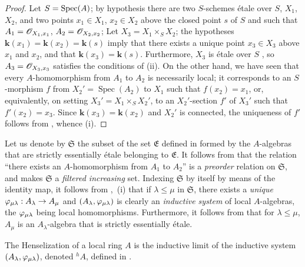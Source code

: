 \begin{proof}
Let $S=\operatorname{Spec}(A)$;
by hypothesis there are two $S$-schemes \'{e}tale over $S$, $X_1$, $X_2$, and two points $x_1\in X_1$, $x_2\in X_2$ above the closed point $s$ of $S$ and such that $A_1=\mathscr{O}_{X_1,x_1}$, $A_2=\mathscr{O}_{X_2,x_2}$;
Let $X_3=X_1\times_{S}X_2$;
the hypotheses $\boldsymbol{k}(x_1)=\boldsymbol{k}(x_2)=\boldsymbol{k}(s)$  imply that there exists a unique point $x_3\in X_3$ above $x_1$ and $x_2$, and that $\boldsymbol{k}(x_3)=\boldsymbol{k}(s)$.
Furthermore, $X_3$ is \'{e}tale over $S$ , so $A_3=\mathscr{O}_{X_3,x_3}$ satisfies the conditions of (ii).
On the other hand, we have seen that every $A$-homomorphism from $A_1$ to $A_2$ is necessarily local;
it corresponds to an $S$-morphism $f$ from $X_2'=\operatorname{Spec}(A_2)$ to $X_1$ such that $f(x_2)=x_1$, or, equivalently, on setting $X_3'=X_1\times_S X_2'$, to an $X_2'$-section $f'$ of $X_3'$ such that $f'(x_2)=x_3$.
Since $\boldsymbol{k}(x_3)=\boldsymbol{k}(x_2)$ and $X_2'$ is connected, the uniqueness of $f'$ follows from , whence (i).
\end{proof}

\begin{env}[18.6.4]
\label{IV.18.6.4}
Let us denote by $\mathfrak{S}$ the subset of the set $\mathfrak{E}$ defined in  formed by the $A$-algebras that are strictly essentially \'{e}tale belonging to $\mathfrak{E}$.
It follows from  that the relation ``there exists an $A$-homomorphism from $A_1$ to $A_2$'' is a \emph{preorder} relation on $\mathfrak{S}$, and makes $\mathfrak{S}$ a \emph{filtered increasing} set.
Indexing $\mathfrak{S}$ by itself by means of the identity map, it follows from ,~(i) that if $\lambda\leq\mu$ in $\mathfrak{S}$, there exists a \emph{unique} $\varphi_{\mu\lambda}:A_\lambda\to A_\mu$ and $(A_\lambda,\varphi_{\mu\lambda})$ is clearly an \emph{inductive system} of local $A$-algebras, the $\varphi_{\mu\lambda}$ being local homomorphisms.
Furthermore, it follows from  that for $\lambda\leq\mu$, $A_\mu$ is an $A_\lambda$-algebra that is strictly essentially \'{e}tale.
\end{env}

\begin{definition}[18.6.5]
\label{IV.18.6.5}
The Henselization of a local ring $A$ is the inductive limit of the inductive system $(A_\lambda,\varphi_{\mu\lambda})$, denoted ${}^h\!A$, defined in .
\end{definition}

